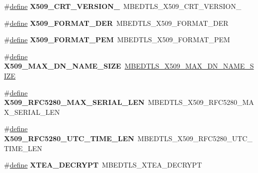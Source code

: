 \begin{DoxyCompactItemize}
\item 
\mbox{\label{compat-1_83_8h_a5aa7c22740f9d1271b76fe9dffe5ce18}} 
\#\hyperlink{structdefine}{define} {\bfseries X509\+\_\+\+C\+R\+T\+\_\+\+V\+E\+R\+S\+I\+O\+N\+\_}~M\+B\+E\+D\+T\+L\+S\+\_\+\+X509\+\_\+\+C\+R\+T\+\_\+\+V\+E\+R\+S\+I\+O\+N\+\_
\item 
\mbox{\label{compat-1_83_8h_a6ca31be06f89a3f5c8abc93654460a77}} 
\#\hyperlink{structdefine}{define} {\bfseries X509\+\_\+\+F\+O\+R\+M\+A\+T\+\_\+\+D\+ER}~M\+B\+E\+D\+T\+L\+S\+\_\+\+X509\+\_\+\+F\+O\+R\+M\+A\+T\+\_\+\+D\+ER
\item 
\mbox{\label{compat-1_83_8h_ae61b2a208043d2d1cfdfea019a15c59b}} 
\#\hyperlink{structdefine}{define} {\bfseries X509\+\_\+\+F\+O\+R\+M\+A\+T\+\_\+\+P\+EM}~M\+B\+E\+D\+T\+L\+S\+\_\+\+X509\+\_\+\+F\+O\+R\+M\+A\+T\+\_\+\+P\+EM
\item 
\mbox{\label{compat-1_83_8h_a3c586080deeac54ce8159bd24fdb64cc}} 
\#\hyperlink{structdefine}{define} {\bfseries X509\+\_\+\+M\+A\+X\+\_\+\+D\+N\+\_\+\+N\+A\+M\+E\+\_\+\+S\+I\+ZE}~\hyperlink{x509_8h_ae08ff254e779a13bd567f877400de7f9}{M\+B\+E\+D\+T\+L\+S\+\_\+\+X509\+\_\+\+M\+A\+X\+\_\+\+D\+N\+\_\+\+N\+A\+M\+E\+\_\+\+S\+I\+ZE}
\item 
\mbox{\label{compat-1_83_8h_a8099883128d3a26dc00e33814def210b}} 
\#\hyperlink{structdefine}{define} {\bfseries X509\+\_\+\+R\+F\+C5280\+\_\+\+M\+A\+X\+\_\+\+S\+E\+R\+I\+A\+L\+\_\+\+L\+EN}~M\+B\+E\+D\+T\+L\+S\+\_\+\+X509\+\_\+\+R\+F\+C5280\+\_\+\+M\+A\+X\+\_\+\+S\+E\+R\+I\+A\+L\+\_\+\+L\+EN
\item 
\mbox{\label{compat-1_83_8h_abc0cae2aafa220212a00ae64dffa49b4}} 
\#\hyperlink{structdefine}{define} {\bfseries X509\+\_\+\+R\+F\+C5280\+\_\+\+U\+T\+C\+\_\+\+T\+I\+M\+E\+\_\+\+L\+EN}~M\+B\+E\+D\+T\+L\+S\+\_\+\+X509\+\_\+\+R\+F\+C5280\+\_\+\+U\+T\+C\+\_\+\+T\+I\+M\+E\+\_\+\+L\+EN
\item 
\mbox{\label{compat-1_83_8h_a12112dc96c2e7b6f1b6a5b38a9471c01}} 
\#\hyperlink{structdefine}{define} {\bfseries X\+T\+E\+A\+\_\+\+D\+E\+C\+R\+Y\+PT}~M\+B\+E\+D\+T\+L\+S\+\_\+\+X\+T\+E\+A\+\_\+\+D\+E\+C\+R\+Y\+PT
\item 

\end{DoxyCompactItemize}
